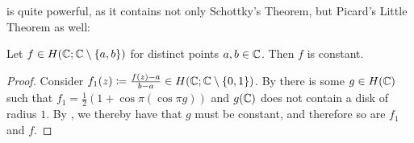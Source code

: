  is quite powerful, as it contains not only Schottky's Theorem, but Picard's Little Theorem as well:

\begin{theorem} \label{thm:picard-little}
    Let $f \in H(\mathbb{C}; \mathbb{C} \setminus \{ a, b \})$ for distinct points $a, b \in \mathbb{C}$. Then $f$ is constant.
\end{theorem}

\begin{proof}
    Consider $f_1(z) \coloneqq \frac{f(z) - a}{b - a} \in H(\mathbb{C}; \mathbb{C} \setminus \{ 0, 1 \})$. By  there is some $g \in H(\mathbb{C})$ such that $f_1 = \frac{1}{2}(1 + \cos \pi (\cos \pi g))$ and $g(\mathbb{C})$ does not contain a disk of radius $1$. By , we thereby have that $g$ must be constant, and therefore so are $f_1$ and $f$.
\end{proof}